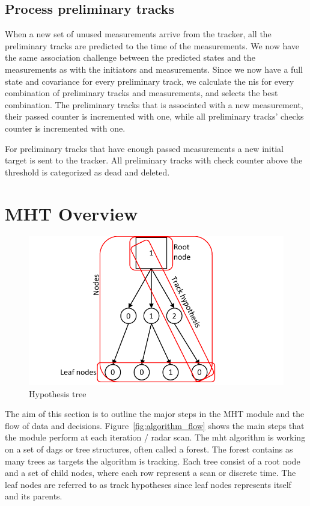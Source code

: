 \subsection{Process preliminary tracks}
When a new set of unused measurements arrive from the tracker, all the preliminary tracks are predicted to the time of the measurements. We now have the same association challenge between the predicted states and the measurements as with the initiators and measurements. Since we now have a full state and covariance for every preliminary track, we calculate the \gls{nis} for every combination of preliminary tracks and measurements, and selects the best combination. The preliminary tracks that is associated with a new measurement, their passed counter is incremented with one, while all preliminary tracks' checks counter is incremented with one. 

For preliminary tracks that have enough passed measurements a new initial target is sent to the tracker. All preliminary tracks with check counter above the threshold is categorized as dead and deleted. 

\section{MHT Overview}
\begin{figure}
 \centering
 \includegraphics{Figures/Track-tree.pdf}
 \caption{Hypothesis tree}\label{fig:hyp_tree}
\end{figure}
The aim of this section is to outline the major steps in the MHT module and the flow of data and decisions. Figure~\ref{fig:algorithm_flow} shows the main steps that the module perform at each iteration / radar scan. The \gls{mht} algorithm is working on a set of \glspl{dag} or  tree structures, often called a forest. The forest contains as many trees as targets the algorithm is tracking. Each tree consist of a root node and a set of child nodes, where each row represent a scan or discrete time. The leaf nodes are referred to as track hypotheses since leaf nodes represents itself and its parents.

